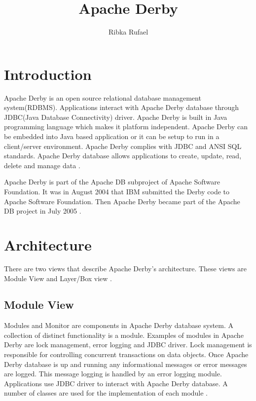 \documentclass[9pt,twocolumn,twoside]{../../styles/osajnl}
\title{Apache Derby}
\author[1,*, +]{Ribka Rufael}
\affil[1]{School of Informatics and Computing, Bloomington, IN 47408, U.S.A.}
\affil[*]{Corresponding authors: rrufael@umail.iu.edu}
\affil[+]{HID: S17-IO-3016}
\begin{document}
\maketitle

\section{Introduction}

Apache Derby is an open source relational database management
system(RDBMS). Applications interact with Apache Derby database
through JDBC(Java Database Connectivity) driver. Apache Derby is built
in Java programming language which makes it platform
independent. Apache Derby can be embedded into Java based application
or it can be setup to run in a client/server environment. Apache Derby
complies with JDBC and ANSI SQL standards. Apache Derby database
allows applications to create, update, read, delete and manage data
\cite{www-derbyoverview,www-apachederbycharter}.

Apache Derby is part of the Apache DB subproject of Apache Software
Foundation. It was in August 2004 that IBM submitted the Derby code to
Apache Software Foundation. Then Apache Derby became part of the
Apache DB project in July 2005 \cite{www-apachederbycharter}.

\section{Architecture}

There are two views that describe Apache Derby's architecture. These
views are Module View and Layer/Box view \cite{www-derbyarch}.

\subsection {Module View} 


Modules and Monitor are components in Apache Derby database system. A
collection of distinct functionality is a module. Examples of modules
in Apache Derby are lock management, error logging and JDBC
driver. Lock management is responsible for controlling concurrent
transactions on data objects. Once Apache Derby database is up and
running any informational messages or error messages are logged. This
message logging is handled by an error logging module.  Applications use
JDBC driver to interact with Apache Derby database. A number of
classes are used for the implementation of each module
\cite{www-derbyarch}.
\end{document}
